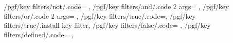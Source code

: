 {    %
    /pgf/key filters/not/.code={%
        \ifpgfkeysfiltercontinue
            \pgfkeysfiltercontinuefalse
        \else
            \pgfkeysfiltercontinuetrue
        \fi
    },%
    /pgf/key filters/and/.code 2 args={%
        \ifpgfkeysfiltercontinue
        \fi
    },%
    /pgf/key filters/or/.code 2 args={%
        \ifpgfkeysfiltercontinue
        \else
        \fi
    },%
    /pgf/key filters/true/.code={\pgfkeysfiltercontinuetrue},%
    /pgf/key filters/true/.install key filter,
    /pgf/key filters/false/.code={%
        \pgfkeysfiltercontinuefalse
    },%
    /pgf/key filters/defined/.code={%
        \if{}%
            \pgfkeysfiltercontinuefalse
        \else
            \pgfkeysfiltercontinuetrue
        \fi
    },
}%

%
%


